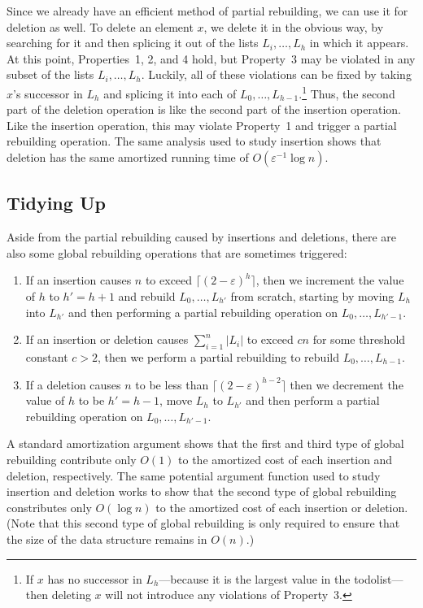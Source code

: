 \documentclass[12pt]{patmorin}
\newcommand{\eps}{\varepsilon}
\begin{document}
Since we already have an efficient method of partial rebuilding, we
can use it for deletion as well. To delete an element $x$, we delete
it in the obvious way, by searching for it and then splicing it out
of the lists $L_i,\ldots,L_h$ in which it appears.  At this point,
Properties~1, 2, and 4 hold, but Property~3 may be violated in any
subset of the lists $L_i,\ldots,L_h$.  Luckily, all of these violations
can be fixed by taking $x$'s successor in $L_h$ and splicing it into
each of $L_0,\ldots,L_{h-1}$.\footnote{If $x$ has no successor in
$L_h$---because it is the largest value in the todolist---then deleting
$x$ will not introduce any violations of Property~3.}  Thus, the second
part of the deletion operation is like the second part of the insertion
operation.  Like the insertion operation, this may violate Property~1
and trigger a partial rebuilding operation.  The same analysis used to
study insertion shows that deletion has the same amortized running time
of $O(\eps^{-1}\log n)$.

\subsection{Tidying Up}

Aside from the partial rebuilding caused by insertions and deletions, there are also some global rebuilding operations that are sometimes triggered:
\begin{enumerate}
\item If an insertion causes $n$ to exceed $\lceil(2-\eps)^h\rceil$, then
we increment the value of $h$ to $h'=h+1$ and rebuild $L_0,\ldots,L_{h'}$
from scratch, starting by moving $L_h$ into $L_{h'}$ and then performing
a partial rebuilding operation on $L_{0},\ldots,L_{h'-1}$.
\item If an insertion or deletion causes $\sum_{i=1}^n |L_i|$ to exceed $cn$ for some threshold constant $c>2$, then we perform a partial rebuilding to rebuild $L_{0},\ldots,L_{h-1}$.
\item If a deletion causes $n$ to be less than $\lceil(2-\eps)^{h-2}\rceil$ then we decrement the value of $h$ to be $h'=h-1$, move $L_h$ to $L_{h'}$ and then perform a partial rebuilding operation on $L_{0},\ldots,L_{h'-1}$. 
\end{enumerate}

A standard amortization argument shows that the first and third type
of global rebuilding contribute only $O(1)$ to the amortized cost of
each insertion and deletion, respectively.  The same potential argument
function used to study insertion and deletion works to show that the
second type of global rebuilding constributes only $O(\log n)$ to the
amortized cost of each insertion or deletion.  (Note that this second
type of global rebuilding is only required to ensure that the size of
the data structure remains in $O(n)$.)
\end{document}
